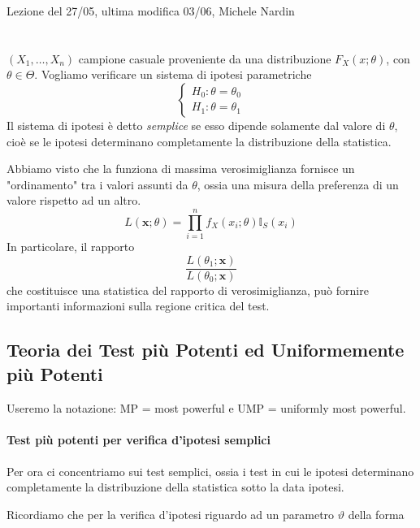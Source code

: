 
Lezione del 27/05, ultima modifica 03/06, Michele Nardin

\chapter{}

\((X_1,\dots,X_n)\) campione casuale proveniente da una distribuzione
\(F_X(x;\theta)\), con \(\theta \in \Theta\). Vogliamo verificare un sistema di ipotesi parametriche
\begin{equation*}
  \begin{cases}
    H_0 \colon \theta = \theta_0 \\ H_1 \colon \theta = \theta_1
  \end{cases}
\end{equation*}
Il sistema di ipotesi è detto \emph{semplice} se esso dipende solamente dal valore di \(\theta\), cioè se le ipotesi determinano completamente la distribuzione della statistica.

Abbiamo visto che la funziona di massima verosimiglianza fornisce un "ordinamento" tra i valori assunti da \(\theta\), ossia una misura della preferenza di un valore rispetto ad un altro.
\begin{equation*}
  L(\mathbf{x};\theta) = \prod_{i=1}^n f_X(x_i;\theta)\mathbb{I}_S(x_i)
\end{equation*}
In particolare, il rapporto
\begin{equation*}
  \frac{L(\theta_1;\mathbf{x})}{L(\theta_0;\mathbf{x})}
\end{equation*}
che costituisce una statistica del rapporto di verosimiglianza, può fornire importanti informazioni sulla regione critica del test.


\section{Teoria dei Test più Potenti ed Uniformemente più Potenti}
Useremo la notazione: MP = most powerful e UMP = uniformly most powerful.\\
\\
\noindent \textbf{Test più potenti per verifica d'ipotesi semplici}\\
\\
Per ora ci concentriamo sui test semplici, ossia i test in cui le ipotesi determinano completamente la distribuzione della statistica sotto la data ipotesi.

Ricordiamo che per la verifica d'ipotesi riguardo ad un parametro $\vartheta$ della forma

